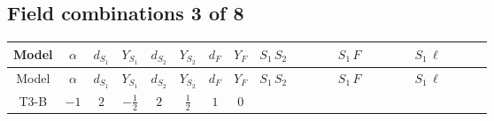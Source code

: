 \documentclass[8pt]{article}
\begin{document}
\begin{landscape}
\subsection*{Field combinations 3 of 8}
\begin{longtable}{@{}cccccccc >{\raggedright\arraybackslash}p{0.21\linewidth} >{\raggedright\arraybackslash}p{0.21\linewidth} >{\raggedright\arraybackslash}p{0.21\linewidth}@{}}
\toprule
Model & $\alpha$ & $d_{S_1}$ & $Y_{S_1}$ & $d_{S_2}$ & $Y_{S_2}$ & $d_F$ & $Y_F$ & $S_1\,S_2$ & $S_1\,F$ & $S_1\,\ell$ \\
\midrule
\endfirsthead
\toprule
Model & $\alpha$ & $d_{S_1}$ & $Y_{S_1}$ & $d_{S_2}$ & $Y_{S_2}$ & $d_F$ & $Y_F$ & $S_1\,S_2$ & $S_1\,F$ & $S_1\,\ell$ \\
\midrule
\endhead
T3-B & $-1$ & $2$ & $-\frac{1}{2}$ & $2$ & $\frac{1}{2}$ & $1$ & $0$ & \scriptsize\adjustbox{max width=\linewidth}{$\begin{gathered} +\text{CNewScalar1NewScalar2} \hbar  S_{1,j_1} S_{2,j_2} \text{Bar}(\text{cg1})_{j_1,j_2} \\ -\frac{1}{2} C_{S_2^\dagger S_2} \hbar  \overline{y_{2,i_1,r_1}} S_{1,j_1} S_{2,j_2} y_{1,i_1,r_1} \text{Bar}(\text{cg1})_{j_1,j_2} \\ -\frac{C_{S_2^\dagger S_2} \hbar  \overline{y_{2,i_1,r_1}} S_{1,j_1} S_{2,j_2} y_{1,i_1,r_1} \text{Bar}(\text{cg1})_{j_1,j_2}}{\epsilon }\end{gathered}$} & \scriptsize\adjustbox{max width=\linewidth}{$\begin{gathered} +C_{S_1^\dagger S_1} \hbar  \log \left(\frac{\bar{\mu}^{2}}{M_F^2}\right) \overline{y_{1,i_1,r_1}} S_{1,j_1} y_{1,i_1,r_1} S_{1,j_1}{}^{\dagger } \\ -\hbar  \log \left(\frac{\bar{\mu}^{2}}{M_F^2}\right) \overline{y_{1,i_1,r_1}} \overline{y_{1,i_2,r_2}} S_{1,j_1} S_{1,j_2} y_{1,i_1,r_2} y_{1,i_2,r_1} S_{1,j_1}{}^{\dagger } S_{1,j_2}{}^{\dagger } \\ -\hbar  \log \left(\frac{\bar{\mu}^{2}}{M_F^2}\right) \overline{y_{1,i_1,r_1}} S_{1,j_3} S_{1,j_4} y_{1,i_1,r_1} S_{1,j_1}{}^{\dagger } S_{1,j_2}{}^{\dagger } \mathcal{I}_{S_1,j_1,j_3,j_2,j_4}{}^1 \lambda_{S_1}^{(1)}^{(1)}\end{gathered}$} & \scriptsize\adjustbox{max width=\linewidth}{$\begin{gathered} \frac{3 \hbar  \overline{L_{a_1,i_1}}\, C\, P_R\, \overline{L_{a_2,i_2}}{}^T S_{1,j_1} S_{1,j_2} y_{1,i_1,r_1} y_{1,i_2,r_1} \mathcal{I}_{y_1,a_1,j_1} \mathcal{I}_{y_1,a_2,j_2} g_2^2}{8 \epsilon  M_F} \\ +\frac{\hbar  \overline{L_{a_1,i_1}}\, C\, P_R\, \overline{L_{a_2,i_2}}{}^T S_{1,j_1} S_{1,j_2} y_{1,i_1,r_1} y_{1,i_2,r_1} \mathcal{I}_{y_1,a_1,j_1} \mathcal{I}_{y_1,a_2,j_2} g_2^2}{8 M_F} \\ +\frac{3 \hbar  \overline{y_{1,i_1,r_1}} \overline{y_{1,i_2,r_1}} L_{a_2,i_2}{}^T\, C\, P_L\, L_{a_1,i_1} {\mathcal{C}_{LS_1F}}^{*}_{a_1,j_1} {\mathcal{C}_{LS_1F}}^{*}_{a_2,j_2} S_{1,j_1}{}^{\dagger } S_{1,j_2}{}^{\dagger } g_2^2}{8 \epsilon  M_F}\end{gathered}$} \\

\end{longtable}
\end{landscape}
\end{document}
